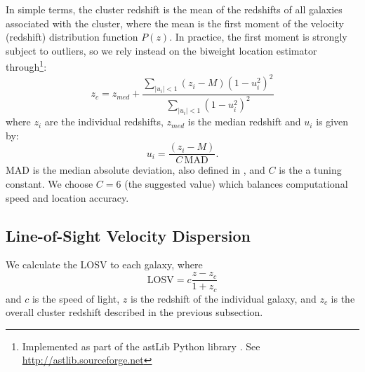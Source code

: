 \documentclass[fleqn,usenatbib]{mnras}
\begin{document}
In simple terms, the cluster redshift is the mean of the redshifts of all galaxies associated with the cluster, where the mean is the first moment of the velocity (redshift) distribution function $P(z)$. In practice, the first moment is strongly subject to outliers, so we rely instead on the biweight location estimator \citep{Beers1990} through\footnote{Implemented as part of the {\sc astLib} Python library \citep{astlib}. See \hbox{\url{http://astlib.sourceforge.net}}}:
\begin{equation}
z_c = z_{med} + \frac{\sum_{|u_i| < 1} (z_i - M)(1-u_i^2)^2}{\sum_{|u_i| < 1}(1-u_i^2)^2}
\end{equation}
where $z_i$ are the individual redshifts, $z_{med}$ is the median redshift and $u_i$ is given by:
\begin{equation}
	u_i = \frac{(z_i - M)}{C\,\mathrm{MAD}}.
\end{equation}
MAD is the median absolute deviation, also defined in \cite{Beers1990}, and $C$ is the a tuning constant. We choose $C=6$ (the suggested value) which balances computational speed and location accuracy. 

\subsection{Line-of-Sight Velocity Dispersion}\label{sec: LOSVD}
We calculate the LOSV to each galaxy, where
\begin{equation}
	\mathrm{LOSV} = c\frac{z - z_c}{1+z_c}
\end{equation}
and $c$ is the speed of light, $z$ is the redshift of the individual galaxy, and $z_c$ is the overall cluster redshift described in the previous subsection.
\end{document}
